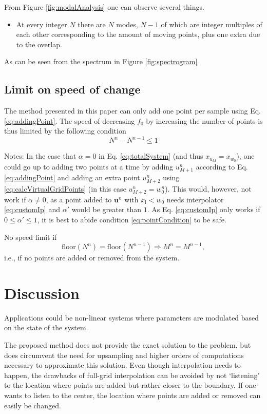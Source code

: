 \documentclass[dvipsnames, reprint]{JASA}
\begin{document}
From Figure \ref{fig:modalAnalysis} one can observe several things. 
\begin{itemize}
    \item At every integer $N$ there are $N$ modes, $N-1$ of which are integer multiples of each other corresponding to the amount of moving points,  plus one extra due to the overlap. 
\end{itemize}

As can be seen from the spectrum in Figure \ref{fig:spectrogram}

\subsection{Limit on speed of change}
The method presented in this paper can only add one point per sample using Eq. \eqref{eq:addingPoint}. The speed of decreasing $f_0$ by increasing the number of points is thus limited by the following condition
\begin{equation}\label{eq:pointCondition}
    N^n - N^{n-1} \leq 1 
\end{equation}

Notes:
In the case that $\alpha = 0$ in Eq. \eqref{eq:totalSystem} (and thus $x_{u_M} = x_{w_0}$), one could go up to adding two points at a time by adding $u_{M+1}^n$ according to Eq. \eqref{eq:addingPoint} and adding an extra point $u_{M+2}^n$ using \eqref{eq:calcVirtualGridPoints} (in this case $u_{M+2}^n = w_0^n$). This would, however, not work if $\alpha \neq 0$, as a point added to $\mathbf{u}^n$ with $x_\text{i} < w_0$ needs interpolator \eqref{eq:customIp} and $\alpha'$ would be greater than $1$. As Eq. \eqref{eq:customIp} only works if $0\leq \alpha' \leq 1$, it is best to abide condition \eqref{eq:pointCondition} to be safe. 

No speed limit if
\begin{equation}
    \text{floor}(N^n) = \text{floor}(N^{n-1})\Rightarrow M^n = M^{n-1},
\end{equation}
i.e., if no points are added or removed from the system. 

\section{Discussion}
Applications could be non-linear systems where parameters are modulated based on the state of the system. 

The proposed method does not provide the exact solution to the problem, but does circumvent the need for upsampling and higher orders of computations necessary to approximate this solution. Even though interpolation needs to happen, the drawbacks of full-grid interpolation can be avoided by not `listening' to the location where points are added but rather closer to the boundary. If one wants to listen to the center, the location where points are added or removed can easily be changed.
\end{document}
